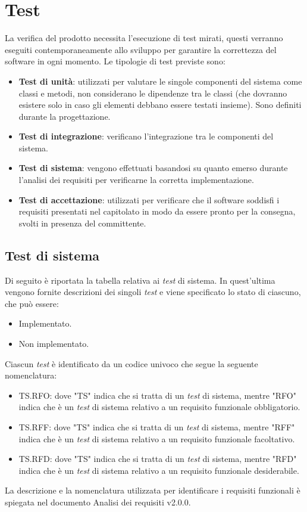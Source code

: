 \section{Test}
La verifica del prodotto necessita l'esecuzione di test mirati, questi verranno eseguiti contemporaneamente allo sviluppo per garantire la correttezza del software in ogni momento.
Le tipologie di test previste sono:
\begin{itemize}
	\item \textbf{Test di unità}: utilizzati per valutare le singole componenti del sistema come classi e metodi, non considerano le dipendenze tra le classi (che dovranno esistere solo in caso gli elementi debbano essere testati insieme).
	      Sono definiti durante la progettazione.
	\item \textbf{Test di integrazione}: verificano l'integrazione tra le componenti del sistema.
	\item \textbf{Test di sistema}: vengono effettuati basandosi su quanto emerso durante l'analisi dei requisiti per verificarne la corretta implementazione.
	\item \textbf{Test di accettazione}: utilizzati per verificare che il software soddisfi i requisiti presentati nel capitolato in modo da essere pronto per la consegna, svolti in presenza del committente.
\end{itemize}

\subsection{Test di sistema}
\label{test_sistema}
Di seguito è riportata la tabella relativa ai \textit{test} di sistema. In quest'ultima vengono fornite descrizioni
dei singoli \textit{test} e viene specificato lo stato di ciascuno, che può essere:
\begin{itemize}
	\item Implementato.
	\item Non implementato.
\end{itemize}
Ciascun \textit{test} è identificato da un codice univoco che segue la seguente nomenclatura:
\begin{itemize}
	\item TS.RFO: dove "TS" indica che si tratta di un \textit{test} di sistema, mentre "RFO" indica che è un \textit{test} di sistema relativo a un requisito funzionale obbligatorio.
	\item TS.RFF: dove "TS" indica che si tratta di un \textit{test} di sistema, mentre "RFF" indica che è un \textit{test} di sistema relativo a un requisito funzionale facoltativo.
	\item TS.RFD: dove "TS" indica che si tratta di un \textit{test} di sistema, mentre "RFD" indica che è un \textit{test} di sistema relativo a un requisito funzionale desiderabile.
\end{itemize}
La descrizione e la nomenclatura utilizzata per identificare i requisiti funzionali è spiegata nel documento Analisi dei requisiti v2.0.0.

